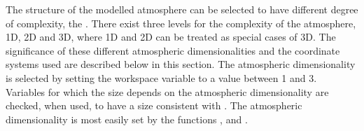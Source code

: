 The structure of the modelled atmosphere can be selected to have
different degree of complexity, the . There exist three levels for the complexity of the
atmosphere, 1D, 2D and 3D, where 1D and 2D can be treated as special
cases of 3D. The significance of these different atmospheric
dimensionalities and the coordinate systems used are described below
in this section. The atmospheric dimensionality is selected by setting
the workspace variable  to a value between 1
and 3. Variables for which the size depends on the atmospheric
dimensionality are checked, when used, to have a size consistent with
. The atmospheric dimensionality is most
easily set by the functions ,
 and .

